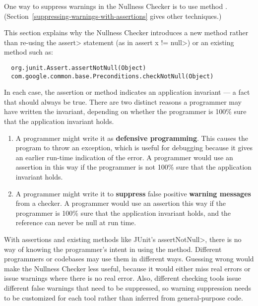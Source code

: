 %


One way to suppress warnings in the Nullness Checker is to use
method .
(Section~\ref{suppressing-warnings-with-assertions} gives other techniques.)

This section explains why the Nullness Checker introduces a new method
rather than re-using the \<assert> statement (as in
\<assert x != null>) or an existing method such as:

\begin{Verbatim}
  org.junit.Assert.assertNotNull(Object)
  com.google.common.base.Preconditions.checkNotNull(Object)
\end{Verbatim}

In each case, the assertion or method indicates an application invariant --- a
fact that should always be true.  There are two distinct reasons a
programmer may have written the invariant, depending on whether the
programmer is 100\% sure that the application invariant holds.

\begin{enumerate}
\item
  A programmer might write it as \textbf{defensive programming}.  This causes
  the program to throw an exception, which is useful for debugging because
  it gives an earlier run-time indication of the error.
  A programmer would use an assertion in this way if the programmer is not
  100\% sure that the application invariant holds.


\item
  A programmer might write it to \textbf{suppress} false positive
  \textbf{warning messages} from a checker.  A programmer would use an
  assertion this way if the programmer is 100\% sure that the application
  invariant holds, and the reference can never be null at run time.

\end{enumerate}

With assertions and existing methods like JUnit's \<assertNotNull>, there
is no way of knowing the programmer's intent in using the method.
Different programmers or codebases may use them in different ways.
Guessing wrong would make the Nullness Checker less useful, because it
would either miss real errors or issue warnings where there is no real
error.  Also, different checking tools issue different false warnings that
need to be suppressed, so warning suppression needs to be customized for
each tool rather than inferred from general-purpose code.


